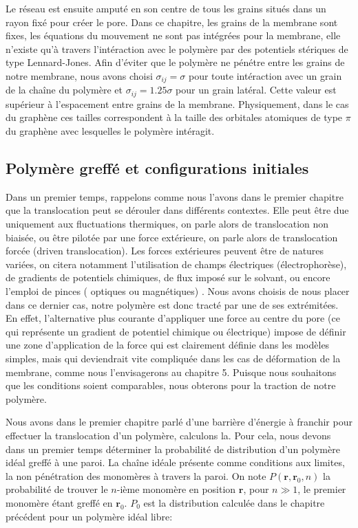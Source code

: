 Le réseau est ensuite amputé en son centre de tous les grains situés dans un rayon fixé pour créer le pore. Dans ce chapitre, les grains de la membrane sont fixes, les équations du mouvement ne sont pas intégrées pour la membrane, elle n'existe qu'à travers l'intéraction avec le polymère par des potentiels stériques de type Lennard-Jones. Afin d'éviter que le polymère ne pénétre entre les grains de notre membrane, nous avons choisi $\sigma_{ij}=\sigma$ pour toute intéraction avec un grain de la chaîne du polymère et $\sigma_{ij}=1.25\sigma$ pour un grain latéral. Cette valeur est supérieur à l'espacement entre grains de la membrane. Physiquement, dans le cas du graphène ces tailles correspondent à la taille des orbitales atomiques de type $\pi$ du graphène avec lesquelles le polymère intéragit.


\subsection{Polymère greffé et configurations initiales}

Dans un premier temps, rappelons comme nous l'avons dans le premier chapitre que la translocation peut se dérouler dans différents contextes. Elle peut être due uniquement aux fluctuations thermiques, on parle alors de translocation non biaisée, ou être pilotée par une force extérieure, on parle alors de translocation forcée (driven translocation). Les forces extérieures peuvent être de natures variées, on citera notamment l'utilisation de champs électriques (électrophorèse), de gradients de potentiels chimiques, de flux imposé sur le solvant, ou encore l'emploi de pinces ( optiques ou magnétiques) \cite{keyser}. Nous avons choisis de nous placer dans ce dernier cas, notre polymère est donc tracté par une de ses extrémitées. En effet, l'alternative plus courante d'appliquer une force au centre du pore (ce qui représente un gradient de potentiel chimique ou électrique) impose de définir une zone d'application de la force qui est clairement définie dans les modèles simples, mais qui deviendrait vite compliquée dans les cas de déformation de la membrane, comme nous l'envisagerons au chapitre 5. Puisque nous souhaitons que les conditions soient comparables, nous obterons pour la traction de notre polymère.



Nous avons dans le premier chapitre parlé d'une barrière d'énergie à franchir pour effectuer la translocation d'un polymère, calculons la. Pour cela, nous devons dans un premier temps déterminer la probabilité de distribution d'un polymère idéal greffé à une paroi. La chaîne idéale présente comme conditions aux limites, la non pénétration des monomères à travers la paroi. On note $P(\textbf{r},\textbf{r}_0,n)$ la probabilité de trouver le $n$-ième monomère en position $\textbf{r}$, pour $n \gg 1$, le premier monomère étant greffé en $\textbf{r}_0$. $P_0$ est la distribution calculée dans le chapitre précédent pour un polymère idéal libre:

